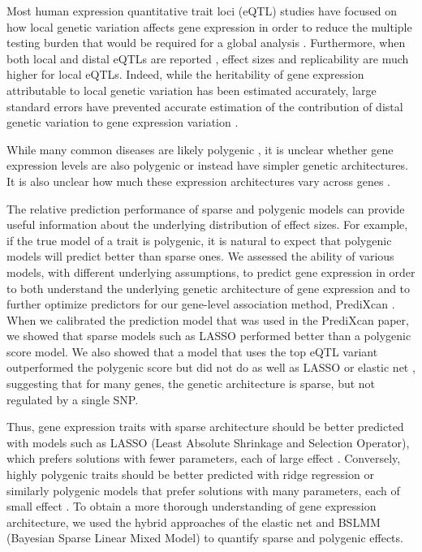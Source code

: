\documentclass[10pt,letterpaper]{article}
\begin{document}
Most human expression quantitative trait loci (eQTL) studies have focused on how local genetic variation affects gene expression in order to reduce the multiple testing burden that would be required for a global analysis \cite{Albert_2015, Stranger_2012}. Furthermore, when both local and distal eQTLs are reported \cite{Stranger_2007,Innocenti_2011,Wright_2014}, effect sizes and replicability are much higher for local eQTLs. Indeed, while the heritability of gene expression attributable to local genetic variation has been estimated accurately, large standard errors have prevented accurate estimation of the contribution of distal genetic variation to gene expression variation \cite{Wright_2014,Price_2011}. 

While many common diseases are likely polygenic \cite{Purcell_2009,Stahl_2012,Morris_2012}, it is unclear whether gene expression levels are also polygenic or instead have simpler genetic architectures. It is also unclear how much these expression architectures vary across genes \cite{Albert_2015}. 

The relative prediction performance of sparse and polygenic models can provide useful information about the underlying distribution of effect sizes. For example, if the true model of a trait is polygenic, it is natural to expect that polygenic models will predict better than sparse ones. We assessed the ability of various models, with different underlying assumptions, to predict gene expression in order to both understand the underlying genetic architecture of gene expression and to further optimize predictors for our gene-level association method, PrediXcan \cite{Gamazon_2015}. When we calibrated the prediction model that was used in the PrediXcan paper, we showed that sparse models such as LASSO performed better than a polygenic score model. We also showed that a model that uses the top eQTL variant outperformed the polygenic score but did not do as well as LASSO or elastic net \cite{Gamazon_2015}, suggesting that for many genes, the genetic architecture is sparse, but not regulated by a single SNP. 

Thus, gene expression traits with sparse architecture should be better predicted with models such as LASSO (Least Absolute Shrinkage and Selection Operator), which prefers solutions with fewer parameters, each of large effect \cite{Tibshirani_1996}. Conversely, highly polygenic traits should be better predicted with ridge regression or similarly polygenic models that prefer solutions with many parameters, each of small effect \cite{Hoerl_1970,de_los_Campos_2010,Wheeler_2014}. To obtain a more thorough understanding of gene expression architecture, we used the hybrid approaches of the elastic net and BSLMM (Bayesian Sparse Linear Mixed Model) \cite{Zhou_2013} to quantify sparse and polygenic effects.
\end{document}
